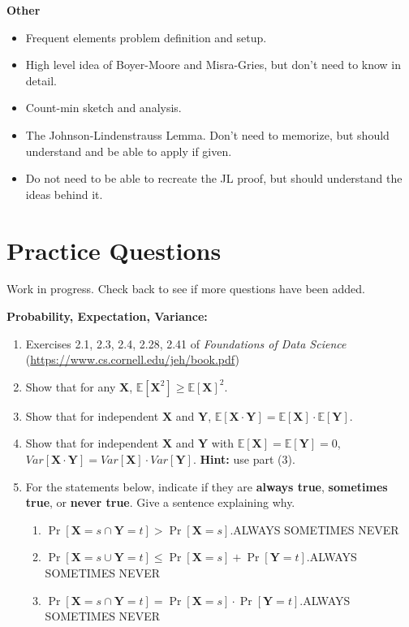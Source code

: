 \documentclass[11pt]{article}
\newcommand{\bv}[1]{\mathbf{#1}}
\newcommand{\E}{\mathbb{E}}
\begin{document}
\noindent \textbf{Other}
\begin{itemize}
\item Frequent elements problem definition and setup.
\item High level idea of Boyer-Moore and Misra-Gries, but don't need to know in detail.
\item Count-min sketch and analysis.
\item The Johnson-Lindenstrauss Lemma. Don't need to memorize, but should understand and be able to apply if given.
\item Do not need to be able to recreate the JL proof, but should understand the ideas behind it.
\end{itemize}

\section{Practice Questions} 

Work in progress. Check back to see if more questions have been added.

\medskip

\noindent\textbf{Probability, Expectation, Variance:}

\begin{enumerate}
\item Exercises 2.1, 2.3, 2.4, 2.28, 2.41 of \emph{Foundations of Data Science} (\url{https://www.cs.cornell.edu/jeh/book.pdf}) 
\item Show that for any $\bv{X}$, $\E[\bv{X}^2] \ge \E[\bv{X}]^2$.
\item Show that for independent $\bv{X}$ and $\bv{Y}$, $\E[\bv{X} \cdot \bv{Y}] = \E[\bv X] \cdot \E[\bv Y]$.
\item Show that for independent $\bv{X}$ and $\bv{Y}$ with $\E[\bv{X}] = \E[\bv{Y}] = 0$, $Var[\bv{X} \cdot \bv{Y}] = Var[\bv X] \cdot Var[\bv Y]$. \textbf{Hint:} use part (3).
\item For the statements below, indicate if they are \textbf{always true}, \textbf{sometimes true}, or \textbf{never true}. Give a sentence explaining why.
\begin{enumerate}
\item $\Pr[\bv{X} = s \cap \bv{Y} = t] > \Pr[\bv{X} = s]$.\hspace{.75em}ALWAYS\hspace{.75em} SOMETIMES\hspace{.75em} NEVER
\item $\Pr[\bv{X} = s \cup \bv{Y} = t] \le \Pr[\bv{X} = s] + \Pr[\bv{Y} = t]$.\hspace{.75em}ALWAYS\hspace{.75em} SOMETIMES\hspace{.75em} NEVER
\item $\Pr[\bv{X} = s \cap \bv{Y} = t] = \Pr[\bv{X} = s] \cdot \Pr[\bv{Y} = t]$.\hspace{.75em}ALWAYS\hspace{.75em} SOMETIMES\hspace{.75em4} NEVER
\end{enumerate}
\end{enumerate}
\end{document}
